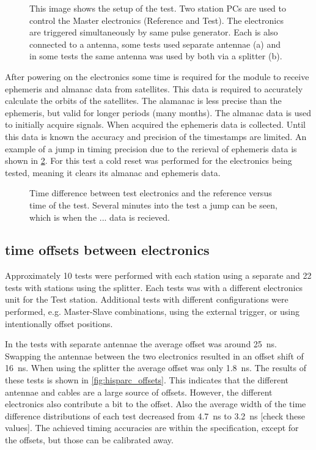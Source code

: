 \begin{figure}
    \centering
    
    \caption{This image shows the setup of the test. Two station PCs are used to control the \hisparc Master electronics (Reference and Test). The electronics are triggered simultaneously by same pulse generator. Each is also connected to a \gps antenna, some tests used separate \gps antennae (a) and in some tests the same \gps antenna was used by both via a splitter (b).}
    \label{fig:setup}
\end{figure}

After powering on the electronics some time is required for the \gps module to receive ephemeris and almanac data from \gps satellites. This data is required to accurately calculate the orbits of the satellites. The alamanac is less precise than the ephemeris, but valid for longer periods (many months). The almanac data is used to initially acquire \gps signals. When acquired the ephemeris data is collected. Until this data is known the accuracy and precision of the timestamps are limited. An example of a jump in timing precision due to the rerieval of ephemeris data is shown in \cref{fig:tt_delta_time_074}. For this test a cold reset was performed for the electronics being tested, meaning it clears its almanac and ephemeris data.

\begin{figure}
    \centering
    
    \caption{Time difference between test electronics and the reference versus time of the test. Several minutes into the test a jump can be seen, which is when the ... data is recieved.}
    \label{fig:tt_delta_time_074}
\end{figure}


\subsection{\gps time offsets between \hisparc electronics}
\label{sub:gps_offsets}

Approximately 10 tests were performed with each station using a separate \gps and 22 tests with stations using the \gps splitter. Each tests was with a different \hisparc electronics unit for the Test station. Additional tests with different configurations were performed, e.g. Master-Slave combinations, using the external trigger, or using intentionally offset \gps positions.

In the tests with separate \gps antennae the average offset was around \SI{25}{\ns}. Swapping the \gps antennae between the two electronics resulted in an offset shift of \SI{16}{\ns}. When using the splitter the average offset was only \SI{1.8}{\ns}. The results of these tests is shown in \cref{fig:hisparc_offsets}. This indicates that the different \gps antennae and cables are a large source of offsets. However, the different \hisparc electronics also contribute a bit to the offset. Also the average width of the time difference distributions of each test decreased from \SI{4.7}{\ns} to \SI{3.2}{\ns} [check these values]. The achieved timing accuracies are within the specification, except for the offsets, but those can be calibrated away.

